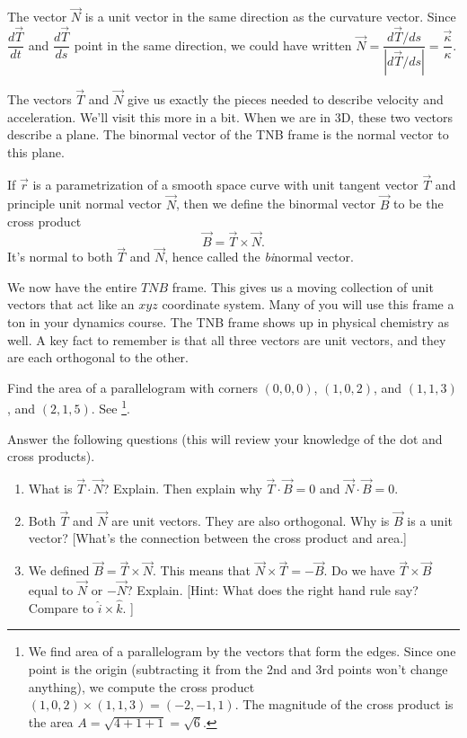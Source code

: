 The vector $\vec N$ is a unit vector in the same direction as the curvature vector.  Since $\dfrac{d\vec T}{dt}$ and $\dfrac{d\vec T}{ds}$ point in the same direction, we could have written $\vec N = \dfrac{d\vec T/ds}{|d\vec T/ds|} = \dfrac{\vec \kappa}{\kappa}$.

The vectors $\vec T$ and $\vec N$ give us exactly the pieces needed to describe velocity and acceleration.  We'll visit this more in a bit.  When we are in 3D, these two vectors describe a plane. The binormal vector of the TNB frame is the normal vector to this plane.  

\begin{definition}
 If $\vec r$ is a parametrization of a smooth space curve with unit tangent vector $\vec T$ and principle unit normal vector $\vec N$, then we define the binormal vector $\vec B$ to be the cross product
$$\vec B = \vec T\times \vec N.$$
 It's normal to both $\vec T$ and $\vec N$, hence called the \textit{bi}normal vector.
\end{definition}

We now have the entire $TNB$ frame.  This gives us a moving collection of unit vectors that act like an $xyz$ coordinate system.  Many of you will use this frame a ton in your dynamics course. The TNB frame shows up in physical chemistry as well. A key fact to remember is that all three vectors are unit vectors, and they are each orthogonal to the other.

\begin{review*}
 Find the area of a parallelogram with corners $(0,0,0)$, $(1,0,2)$, and $(1,1,3)$, and $(2,1,5)$.  See \footnote{
We find area of a parallelogram by the vectors that form the edges. Since one point is the origin (subtracting it from the 2nd and 3rd points won't change anything), we compute the cross product
$(1,0,2)\times 
(1,1,3) 
= (-2,-1,1) $. The magnitude of the cross product is the area $A = \sqrt{4+1+1}=\sqrt{6}$.
}.
\end{review*}


\begin{problem}
Answer the following questions (this will review your knowledge of the dot and cross products).
\begin{enumerate}
 \item What is $\vec T\cdot \vec N$? Explain. Then explain why $\vec T\cdot \vec B=0$ and $\vec N\cdot \vec B=0$.
 \item Both $\vec T$ and $\vec N$ are unit vectors. They are also orthogonal. Why is $\vec B$ is a unit vector? [What's the connection between the cross product and area.] 
 \item We defined $\vec B=\vec T\times \vec N$. This means that $\vec N\times \vec T=-\vec B$.  Do we have $\vec T\times \vec B$ equal to $\vec N$ or $-\vec N$? Explain. [Hint: What does the right hand rule say? Compare to $\hat i\times \hat k$. ]
\end{enumerate}
\end{problem}

